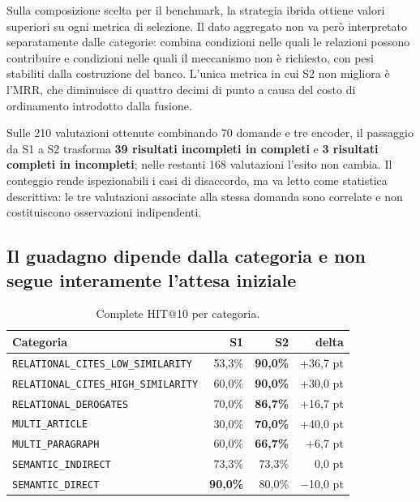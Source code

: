 Sulla composizione scelta per il benchmark, la strategia ibrida ottiene valori superiori su ogni metrica di selezione. Il dato aggregato non va però interpretato separatamente dalle categorie: combina condizioni nelle quali le relazioni possono contribuire e condizioni nelle quali il meccanismo non è richiesto, con pesi stabiliti dalla costruzione del banco. L'unica metrica in cui S2 non migliora è l'MRR, che diminuisce di quattro decimi di punto a causa del costo di ordinamento introdotto dalla fusione.

Sulle 210 valutazioni ottenute combinando 70 domande e tre encoder, il passaggio da S1 a S2 trasforma \textbf{39 risultati incompleti in completi} e \textbf{3 risultati completi in incompleti}; nelle restanti 168 valutazioni l'esito non cambia. Il conteggio rende ispezionabili i casi di disaccordo, ma va letto come statistica descrittiva: le tre valutazioni associate alla stessa domanda sono correlate e non costituiscono osservazioni indipendenti.

\subsection{Il guadagno dipende dalla categoria e non segue interamente l'attesa iniziale}

\begin{table}[H]
    \centering
    \renewcommand{\arraystretch}{1.2}
    \begin{tabular}{|l|r|r|r|}
        \hline
        \textbf{Categoria} & \textbf{S1} & \textbf{S2} & \textbf{delta} \\
        \hline
        \texttt{RELATIONAL\_CITES\_LOW\_SIMILARITY} & 53,3\% & \textbf{90,0\%} & +36,7 pt \\
        \texttt{RELATIONAL\_CITES\_HIGH\_SIMILARITY} & 60,0\% & \textbf{90,0\%} & +30,0 pt \\
        \texttt{RELATIONAL\_DEROGATES} & 70,0\% & \textbf{86,7\%} & +16,7 pt \\
        \texttt{MULTI\_ARTICLE} & 30,0\% & \textbf{70,0\%} & +40,0 pt \\
        \texttt{MULTI\_PARAGRAPH} & 60,0\% & \textbf{66,7\%} & +6,7 pt \\
        \texttt{SEMANTIC\_INDIRECT} & 73,3\% & 73,3\% & 0,0 pt \\
        \texttt{SEMANTIC\_DIRECT} & \textbf{90,0\%} & 80,0\% & $-$10,0 pt \\
        \hline
    \end{tabular}
    \caption{Complete HIT@10 per categoria.}
    \label{tab:per_categoria}
\end{table}

